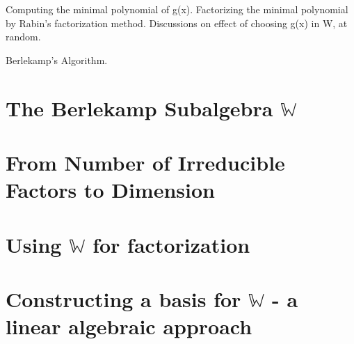 
\noindent

Computing the minimal polynomial of g(x). Factorizing the minimal polynomial by Rabin's factorization method. Discussions on effect of choosing g(x) in W, at random.

Berlekamp's Algorithm.

\section{The Berlekamp Subalgebra $\mathbb{W}$}

\section{From Number of Irreducible Factors to Dimension}

\section{Using $\mathbb{W}$ for factorization}

\section{Constructing a basis for $\mathbb{W}$ - a linear algebraic approach}
